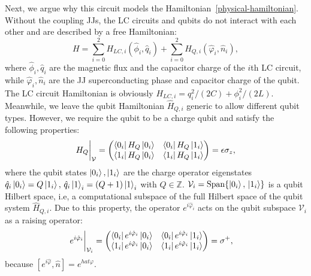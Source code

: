 \documentclass[reprint, aps, prx, amsmath, amssymb, longbibliography, superscriptaddress]{revtex4-2}
\begin{document}
Next, we argue why this circuit models the Hamiltonian~\eqref{physical-hamiltonian}. Without the coupling JJs, the LC circuits and qubits do not interact with each other and are described by a free Hamiltonian:
\begin{equation}
    H = \sum_{i = 0}^2  H_{LC, i}(\hat \phi_i, \hat q_i) + \sum_{i = 0}^2 H_{Q,i}(\hat \varphi_i, \hat n_i),
\end{equation}
where $ \hat\phi_i, \hat q_i$ are the magnetic flux and the capacitor charge of the $i$th LC circuit, while $\hat \varphi_i, \hat n_i$ are the JJ superconducting phase and capacitor charge of the qubit. The LC circuit Hamiltonian is obviously $ H_{LC, i} = q_i^2/(2C) + \phi_i^2/(2L)$. Meanwhile, we leave the qubit Hamiltonian $\hat H_{Q,i} $ generic to allow different qubit types. However, we require the qubit to be a charge qubit and satisfy the following properties:
\begin{align}
   H_{Q}\bigg|_{\mathcal{V}} = \begin{pmatrix} \bra{0_i} H_Q\ket{0_i} & \bra{0_i} H_Q \ket{1_i} \\ \bra{1_i} H_Q \ket{0_i} & \bra{1_i} H_Q \ket{1_i} \end{pmatrix} = \epsilon \sigma_z,
\end{align}
where the qubit states $\ket{0_i},\ket{1_i}$ are the charge operator eigenstates $ \hat q_i \ket{0_i} = Q \ket{1_i}, \, \hat q_{i} \ket{1}_i = (Q+1)\ket{1}_i$ with $ Q \in \mathbb{Z}$. $\mathcal{V}_i = \operatorname{Span}\{\ket{0_i},\, \ket{1_i}\}$ is a qubit Hilbert space, i.e, a computational subspace of the full Hilbert space of the qubit system $ \hat H_{Q,i}$. Due to this property, the operator $ e^{i\hat \varphi_i} $ acts on the qubit subspace $\mathcal{V}_i$ as a raising operator:
\begin{equation}
  \begin{aligned}
    &e^{i\hat\varphi_i}\bigg|_{\mathcal{V}_i} = \begin{pmatrix} \bra{0_i} e^{i\hat\varphi_i} \ket{0_i} & \bra{0_i} e^{i\hat\varphi_i} \ket{1_i} \\ \bra{1_i} e^{i\hat\varphi_i} \ket{0_i} & \bra{1_i} e^{i\hat\varphi_i} \ket{1_i} \end{pmatrix} = \sigma^+,
  \end{aligned}
\end{equation}
because $[e^{i\hat \varphi}, \hat n] = e^{hat \varphi}$.
\end{document}
